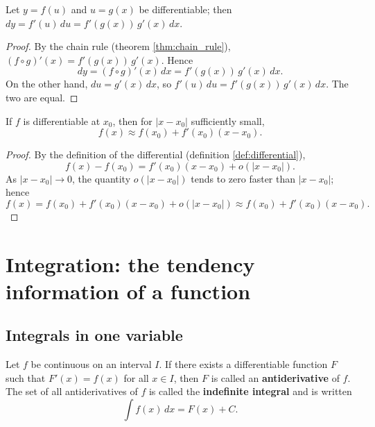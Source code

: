 \begin{theorem}\label{thm:invariance_differential}
Let $y = f(u)$ and $u = g(x)$ be differentiable; then $dy = f'(u)\,du = f'(g(x))\,g'(x)\,dx$.
\end{theorem}

\begin{proof}
By the chain rule (theorem \ref{thm:chain_rule}), $(f \circ g)'(x) = f'(g(x))\,g'(x)$. Hence
\[
dy = (f \circ g)'(x)\,dx = f'(g(x))\,g'(x)\,dx.
\]
On the other hand, $du = g'(x)\,dx$, so $f'(u)\,du = f'(g(x))\,g'(x)\,dx$. The two are equal.
\end{proof}

\begin{corollary}\label{cor:linear_approximation}
If $f$ is differentiable at $x_0$, then for $|x - x_0|$ sufficiently small,
\[f(x) \approx f(x_0) + f'(x_0)(x - x_0).\]
\end{corollary}

\begin{proof}
By the definition of the differential (definition \ref{def:differential}),
\[
f(x) - f(x_0) = f'(x_0)(x - x_0) + o(|x - x_0|).
\]
As $|x - x_0| \to 0$, the quantity $o(|x-x_0|)$ tends to zero faster than $|x-x_0|$; hence
\[
f(x) = f(x_0) + f'(x_0)(x - x_0) + o(|x - x_0|) \approx f(x_0) + f'(x_0)(x - x_0).
\]
\end{proof}

\section{\texorpdfstring{Integration: the tendency information of a function}{Integration: the tendency information of a function}}

\subsection{\texorpdfstring{Integrals in one variable}{Integrals in one variable}}

\begin{definition}\label{def:indefinite_integral}
Let $f$ be continuous on an interval $I$. If there exists a differentiable function $F$ such that $F'(x) = f(x)$ for all $x \in I$, then $F$ is called an \textbf{antiderivative} of $f$. The set of all antiderivatives of $f$ is called the \textbf{indefinite integral} and is written
\[\int f(x)\,dx = F(x) + C.\]
\end{definition}

